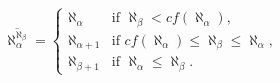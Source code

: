 $$\overline{\aleph_{\alpha}^{\aleph_{\beta}}} =
\begin{cases}
\aleph_{\alpha} & \text{if } \aleph_{\beta} < cf(\aleph_{\alpha}),\\
\aleph_{\alpha+1} & \text{if } cf(\aleph_{\alpha}) \leq \aleph_{\beta} \leq \aleph_{\alpha},\\
\aleph_{\beta+1} & \text{if } \aleph_{\alpha} \leq \aleph_{\beta}.
\end{cases}$$